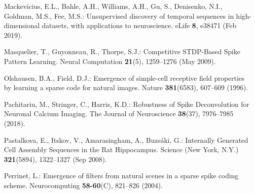 \documentclass[runningheads]{llncs}
\begin{document}
\begin{thebibliography}{10}
  Mackevicius, E.L., Bahle, A.H., Williams, A.H., Gu, S., Denisenko, N.I., Goldman, M.S., Fee, M.S.: Unsupervised discovery of temporal sequences in high-dimensional datasets, with applications to neuroscience. eLife  \textbf{8},  e38471 (Feb 2019). %
  
  Masquelier, T., Guyonneau, R., Thorpe, S.J.: Competitive {STDP}-{Based} {Spike} {Pattern} {Learning}. Neural Computation  \textbf{21}(5),  1259--1276 (May 2009). %
  
  Olshausen, B.A., Field, D.J.: Emergence of simple-cell receptive field properties by learning a sparse code for natural images. Nature  \textbf{381}(6583),  607--609 (1996). %
  
  Pachitariu, M., Stringer, C., Harris, K.D.: Robustness of {Spike} {Deconvolution} for {Neuronal} {Calcium} {Imaging}. The Journal of Neuroscience  \textbf{38}(37),  7976--7985 (2018). %
  
  Pastalkova, E., Itskov, V., Amarasingham, A., Buzsáki, G.: Internally {Generated} {Cell} {Assembly} {Sequences} in the {Rat} {Hippocampus}. Science (New York, N.Y.)  \textbf{321}(5894),  1322--1327 (Sep 2008). %
  
  Perrinet, L.: Emergence of filters from natural scenes in a sparse spike coding scheme. Neurocomputing  \textbf{58-60}(C),  821--826 (2004). %
  

\end{thebibliography}
\end{document}
